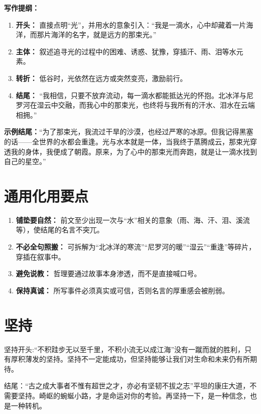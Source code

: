 \textbf{写作提纲：}
\begin{enumerate}
    \item \textbf{开头：} 直接点明“光”，并用水的意象引入：“我是一滴水，心中却藏着一片海洋，而那片海洋的名字，就是远方的那束光。”
    \item \textbf{主体：} 叙述追寻光的过程中的困难、诱惑、犹豫，穿插汗、雨、泪等水元素。
    \item \textbf{转折：} 低谷时，光依然在远方或突然变亮，激励前行。
    \item \textbf{结尾：} “我相信，只要不放弃流动，每一滴水都能抵达光的怀抱。北冰洋与尼罗河在湿云中交融，而我心中的那束光，也终将与我所有的汗水、泪水在云端相拥。”
\end{enumerate}

\textbf{示例结尾：}“为了那束光，我流过干旱的沙漠，也经过严寒的冰原。但我记得黑塞的话——全世界的水都会重逢。光与水本就是一体，当我终于蒸腾成云，那束光穿透我的身体，我便成了朝霞。原来，为了心中的那束光而奔跑，就是让一滴水找到自己的星空。”


\section{通用化用要点}
\begin{tcolorbox}[colback=yellow!10, colframe=orange!50, title=化用要点]
\begin{enumerate}[leftmargin=*]
    \item \textbf{铺垫要自然：} 前文至少出现一次与“水”相关的意象（雨、海、汗、泪、溪流等），使结尾的名言不突兀。
    \item \textbf{不必全句照搬：} 可拆解为“北冰洋的寒流”“尼罗河的暖”“湿云”“重逢”等碎片，穿插在叙事中。
    \item \textbf{避免说教：} 哲理要通过故事本身渗透，而不是直接喊口号。
    \item \textbf{保持真诚：} 所写事件必须真实或可信，否则名言的厚重感会被削弱。
\end{enumerate}
\end{tcolorbox}


\section{坚持}


坚持开头:“不积跬步无以至千里，不积小流无以成江海”没有一蹴而就的胜利，只有厚积薄发的坚持。坚持不一定能成功，但坚持能够让我们对生命和未来仍有所期待。

结尾：“古之成大事者不惟有超世之才，亦必有坚韧不拔之志”平坦的康庄大道，不需要坚持。崎岖的蜿蜒小路，才是命运对你的考验。再坚持一下，是一种信念，也是一种转机。


